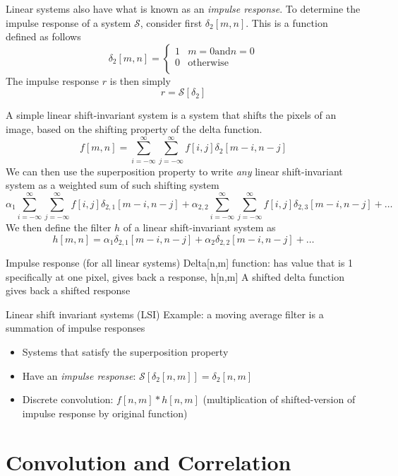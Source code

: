\documentclass{article}
\begin{document}
Linear systems also have what is known as an \emph{impulse response}. To determine the impulse response of a system $\mathcal{S}$, consider first $\delta_2[m, n]$. This is a function defined as follows
\[
	\delta_2[m, n] = \begin{cases} 1 & m = 0 \text{and} n = 0 \\
    0 & \text{otherwise} \\
    \end{cases}
\]
The impulse response $r$ is then simply
\[
	r = \mathcal{S}[\delta_2]
\]

A simple linear shift-invariant system is a system that shifts the pixels of an image, based on the shifting property of the delta function.
\[
	f[m, n] = \sum\limits_{i = -\infty}^{\infty}\sum\limits_{j = -\infty}^{\infty} f[i, j] \delta_2[m - i, n - j]
\]
We can then use the superposition property to write \emph{any} linear shift-invariant system as a weighted sum of such shifting system
\[
	\alpha_1\sum\limits_{i = -\infty}^{\infty}\sum\limits_{j = -\infty}^{\infty} f[i, j] \delta_{2,1}[m - i, n - j] + \alpha_{2,2}\sum\limits_{i = -\infty}^{\infty}\sum\limits_{j = -\infty}^{\infty} f[i, j] \delta_{2,3}[m - i, n - j] + \dots
\]
We then define the filter $h$ of a linear shift-invariant system as
\[
	h[m, n] = \alpha_1\delta_{2,1}[m - i, n - j] + \alpha_2\delta_{2,2}[m - i, n - j] + \dots
\]


Impulse response (for all linear systems)
Delta[n,m] function: has value that is 1 specifically at one pixel, gives back a response, h[n,m]
A shifted delta function gives back a shifted response

Linear shift invariant systems (LSI)
Example: a moving average filter is a summation of impulse responses


\begin{itemize}
		\item Systems that satisfy the superposition property
		\item Have an \emph{impulse response}: $\mathcal{S}[\delta_2[n, m]] = \delta_2[{n, m}]$
		
		\item Discrete convolution: $f[n, m] * h[n, m]$ (multiplication of shifted-version of impulse response by original function)
	\end{itemize}

\section{Convolution and Correlation}
\end{document}
